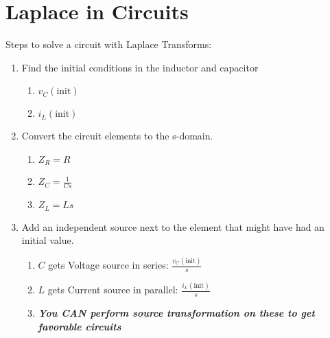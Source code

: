 \section*{Laplace in Circuits}
Steps to solve a circuit with Laplace Transforms:
	\begin{enumerate}
		\item Find the initial conditions in the inductor and capacitor
		\begin{enumerate}
			\item $v_{C} \left( \text{init} \right)$
			\item $i_{L} \left( \text{init} \right)$
		\end{enumerate}
		
		\item Convert the circuit elements to the s-domain.
		\begin{enumerate}
			\item $Z_{R} = R$
			\item $Z_{C} = \frac{1}{Cs}$
			\item $Z_{L} = Ls$
		\end{enumerate}
		
		\item Add an independent source next to the element that might have had an initial value.
			\begin{enumerate}
				\item $C$ gets Voltage source in series: $\frac{v_{C} \left( \text{init} \right)}{s}$
				\item $L$ gets Current source in parallel: $\frac{i_{L}  \left( \text{init} \right)}{s}$
				\item \emph{\textbf{You CAN perform source transformation on these to get favorable circuits}}
			\end{enumerate}
	\end{enumerate}
